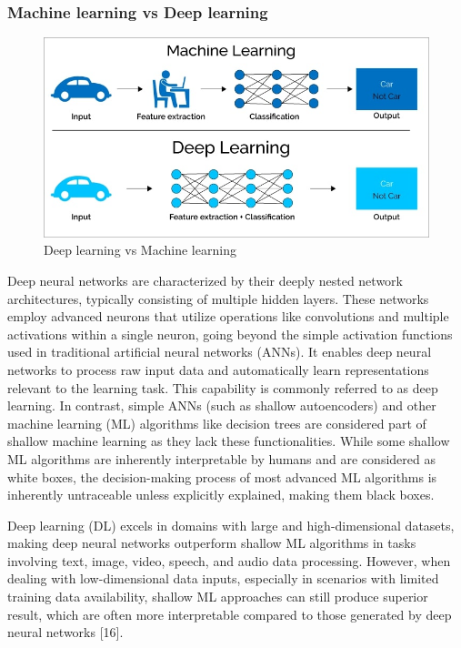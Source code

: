 \subsubsection{Machine learning vs Deep learning}

\begin{center}
    \begin{figure}[!htp]
        \centering
        \includegraphics[width=0.8 \textwidth]{image/dnn_vs_ml.png}
        \caption{Deep learning vs Machine learning}
        \label{subsection}
    \end{figure}
    \end{center}

Deep neural networks are characterized by their deeply nested network architectures, typically consisting of multiple hidden layers. These networks employ advanced neurons that utilize operations like convolutions and multiple activations within a single neuron, going beyond the simple activation functions used in traditional artificial neural networks (ANNs). 
It enables deep neural networks to process raw input data and automatically learn representations relevant to the learning task. This capability is commonly referred to as deep learning. In contrast, simple ANNs (such as shallow autoencoders) and other machine learning (ML) algorithms like decision trees are considered part of shallow machine learning as they lack these functionalities. 
While some shallow ML algorithms are inherently interpretable by humans and are considered as white boxes, the decision-making process of most advanced ML algorithms is inherently untraceable unless explicitly explained, making them black boxes.

Deep learning (DL) excels in domains with large and high-dimensional datasets, making deep neural networks outperform shallow ML algorithms in tasks involving text, image, video, speech, and audio data processing. 
However, when dealing with low-dimensional data inputs, especially in scenarios with limited training data availability, shallow ML approaches can still produce superior result, 
which are often more interpretable compared to those generated by deep neural networks [16]. 

